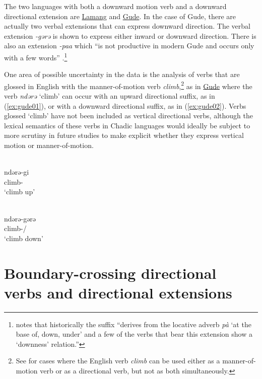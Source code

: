 The two languages with both a downward motion verb and a downward directional extension are \hyperref[lama]{Lamang} and \hyperref[gude]{Gude}. In the case of Gude, there are actually two verbal extensions that can express downward direction. The verbal extension \textit{-gərə} is shown to express either inward or downward direction. There is also an extension \textit{-paa} which ``is not productive in modern Gude and occurs only with a few words'' \citep[101]{hoskinsonGrammarDictionaryGude1983}.\footnote{\citet[359]{schuhChadicCornucopia2017} notes that historically the suffix ``derives from the locative adverb \textit{pà} ‘at the base of, down, under’ and a few of the verbs that bear this extension show a `downness' relation.'' }

One area of possible uncertainty in the data is the analysis of verbs that are glossed in English with the manner-of-motion verb \textit{climb},\footnote{See \citet{levinLexicalizedMeaningManner2013} for cases where the English verb \textit{climb} can be used either as a manner-of-motion verb or as a directional verb, but not as both simultaneously.} as in \hyperref[gude]{Gude} where the verb \textit{ndərə} `climb' can occur with an upward directional suffix, as in (\ref{ex:gude01}), or with a downward directional suffix, as in (\ref{ex:gude02}). Verbs glossed `climb' have not been included as vertical directional verbs, although the lexical semantics of these verbs in Chadic languages would ideally be subject to more scrutiny in future studies to make explicit whether they express vertical motion or manner-of-motion. 

\ea\label{ex:gude01}
 \\
\gll ndərə-gi	\\
climb-	\\
\glt `climb up'

\ex\label{ex:gude02}
 \\
\gll ndərə-gərə	\\
climb-/	\\
\glt `climb down'
\z 

\section{Boundary-crossing directional verbs and directional extensions} \label{sec:boundedV}

